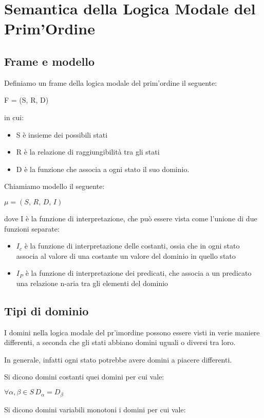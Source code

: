 \section{Semantica della Logica Modale del Prim'Ordine}


\subsection{Frame e modello}

Definiamo un frame della logica modale del prim'ordine il seguente:

F = (S, R, D)

in cui:
\begin{itemize}
\item S è insieme dei possibili stati
\item R è la relazione di raggiungibilità tra gli stati
\item D è la funzione che associa a ogni stato il suo dominio.
\end{itemize}
Chiamiamo modello il seguente:

$\mu=(S,\, R,\, D,\, I)$

dove I è la funzione di interpretazione, che può essere vista come
l'unione di due funzioni separate:
\begin{itemize}
\item $I_{c}$ è la funzione di interpretazione delle costanti, ossia che
in ogni stato associa al valore di una costante un valore del dominio
in quello stato
\item $I_{P}$ è la funzione di interpretazione dei predicati, che associa
a un predicato una relazione n-aria tra gli elementi del dominio
\end{itemize}

\subsection{Tipi di dominio}

I domini nella logica modale del pr'imordine possono essere visti
in verie maniere differenti, a seconda che gli stati abbiano domini
uguali o diversi tra loro.

In generale, infatti ogni stato potrebbe avere domini a piacere differenti.

Si dicono domini costanti quei domini per cui vale:

$\forall\alpha,\beta\in S\, D_{\alpha}=D_{\beta}$

Si dicono domini variabili monotoni i domini per cui vale:

